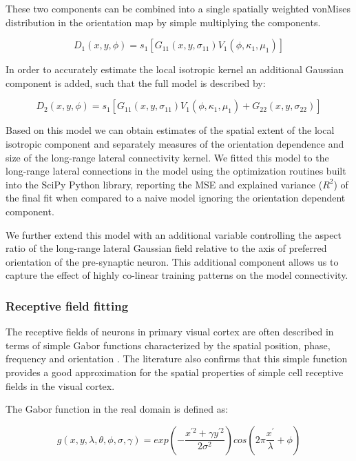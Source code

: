 These two components can be combined into a single spatially weighted
vonMises distribution in the orientation map by simple multiplying the
components.

\begin{equation}
D_1(x, y, \phi) = s_1 [G_{11}(x, y, \sigma_{11}) V_1(\phi, \kappa_1, \mu_1)]
\end{equation}

In order to accurately estimate the local isotropic kernel an
additional Gaussian component is added, such that the full model is
described by:

\begin{equation}
D_2(x, y, \phi) = s_1 [G_{11}(x, y, \sigma_{11}) V_1(\phi, \kappa_1, \mu_1) + G_{22}(x, y, \sigma_{22})]
\end{equation}

Based on this model we can obtain estimates of the spatial extent of
the local isotropic component and separately measures of the
orientation dependence and size of the long-range lateral connectivity
kernel. We fitted this model to the long-range lateral connections in
the model using the optimization routines built into the SciPy Python
library, reporting the MSE and explained variance ($R^2$) of the final
fit when compared to a naive model ignoring the orientation dependent
component.

We further extend this model with an additional variable controlling
the aspect ratio of the long-range lateral Gaussian field relative to
the axis of preferred orientation of the pre-synaptic neuron. This
additional component allows us to capture the effect of highly
co-linear training patterns on the model connectivity.

\subsubsection{Receptive field fitting} \label{rffitting}

The receptive fields of neurons in primary visual cortex are often
described in terms of simple Gabor functions characterized by the
spatial position, phase, frequency and orientation
\citep{Jones1987,Ringach2002}. The literature also confirms that this
simple function provides a good approximation for the spatial
properties of simple cell receptive fields in the visual cortex.

The Gabor function in the real domain is defined as:

\begin{equation}
  g(x, y, \lambda, \theta, \phi, \sigma, \gamma) = exp(-\frac{x^{\prime 2} + \gamma y^{\prime 2}}{2\sigma^2}) cos(2 \pi \frac{x^\prime}{\lambda}+\phi)
\end{equation}

